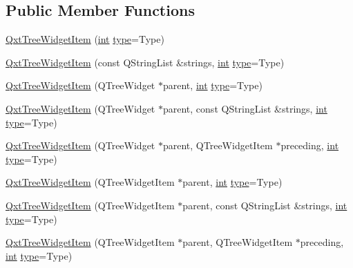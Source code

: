 \subsection*{Public Member Functions}
\begin{DoxyCompactItemize}
\item 
\hyperlink{class_qxt_tree_widget_item_ac99c92301a4f23de295d2bbbcfa0f598}{Qxt\-Tree\-Widget\-Item} (\hyperlink{ioapi_8h_a787fa3cf048117ba7123753c1e74fcd6}{int} \hyperlink{glext_8h_a7d05960f4f1c1b11f3177dc963a45d86}{type}=Type)
\item 
\hyperlink{class_qxt_tree_widget_item_a363d5ad1dae15c69fc12457862e86b53}{Qxt\-Tree\-Widget\-Item} (const Q\-String\-List \&strings, \hyperlink{ioapi_8h_a787fa3cf048117ba7123753c1e74fcd6}{int} \hyperlink{glext_8h_a7d05960f4f1c1b11f3177dc963a45d86}{type}=Type)
\item 
\hyperlink{class_qxt_tree_widget_item_abdc225a17647a449b8f1f343c603c6a4}{Qxt\-Tree\-Widget\-Item} (Q\-Tree\-Widget $\ast$parent, \hyperlink{ioapi_8h_a787fa3cf048117ba7123753c1e74fcd6}{int} \hyperlink{glext_8h_a7d05960f4f1c1b11f3177dc963a45d86}{type}=Type)
\item 
\hyperlink{class_qxt_tree_widget_item_a5abb7238c40ae7e71bac831cf000ed2e}{Qxt\-Tree\-Widget\-Item} (Q\-Tree\-Widget $\ast$parent, const Q\-String\-List \&strings, \hyperlink{ioapi_8h_a787fa3cf048117ba7123753c1e74fcd6}{int} \hyperlink{glext_8h_a7d05960f4f1c1b11f3177dc963a45d86}{type}=Type)
\item 
\hyperlink{class_qxt_tree_widget_item_a6c7778164f260b0694cd00407cfaa348}{Qxt\-Tree\-Widget\-Item} (Q\-Tree\-Widget $\ast$parent, Q\-Tree\-Widget\-Item $\ast$preceding, \hyperlink{ioapi_8h_a787fa3cf048117ba7123753c1e74fcd6}{int} \hyperlink{glext_8h_a7d05960f4f1c1b11f3177dc963a45d86}{type}=Type)
\item 
\hyperlink{class_qxt_tree_widget_item_a91408ec95383b022e1155912626a3efd}{Qxt\-Tree\-Widget\-Item} (Q\-Tree\-Widget\-Item $\ast$parent, \hyperlink{ioapi_8h_a787fa3cf048117ba7123753c1e74fcd6}{int} \hyperlink{glext_8h_a7d05960f4f1c1b11f3177dc963a45d86}{type}=Type)
\item 
\hyperlink{class_qxt_tree_widget_item_a59cc8f8397d8aa3540b025338cc7f972}{Qxt\-Tree\-Widget\-Item} (Q\-Tree\-Widget\-Item $\ast$parent, const Q\-String\-List \&strings, \hyperlink{ioapi_8h_a787fa3cf048117ba7123753c1e74fcd6}{int} \hyperlink{glext_8h_a7d05960f4f1c1b11f3177dc963a45d86}{type}=Type)
\item 
\hyperlink{class_qxt_tree_widget_item_a9676c75cdfde30986c7450fe90c25a1a}{Qxt\-Tree\-Widget\-Item} (Q\-Tree\-Widget\-Item $\ast$parent, Q\-Tree\-Widget\-Item $\ast$preceding, \hyperlink{ioapi_8h_a787fa3cf048117ba7123753c1e74fcd6}{int} \hyperlink{glext_8h_a7d05960f4f1c1b11f3177dc963a45d86}{type}=Type)

\end{DoxyCompactItemize}
